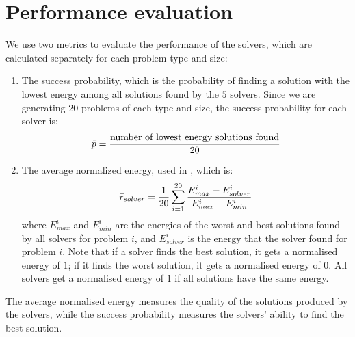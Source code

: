 

\section{Performance evaluation}
We use two metrics to evaluate the performance of the solvers, which are calculated separately for each problem type and size:
\begin{enumerate}
    \item The success probability, which is the probability of finding a solution with the lowest energy among all solutions found by the $5$ solvers. Since we are generating $20$ problems of each type and size, the success probability for each solver is:
    \begin{equation}
        \Bar{p} = \frac{\text{number of lowest energy solutions found}}{20}
    \end{equation}
    \item The average normalized energy, used in \cite{b34}, which is:
    \begin{equation}
        \Bar{r}_{solver} =  \frac{1}{20} \sum_{i = 1}^{20} \frac{E^i_{max} - E^i_{solver}}{E^i_{max} - E^i_{min}}
    \end{equation}
    where $E^i_{max}$ and $E^i_{min}$ are the energies of the worst and best solutions found by all solvers for problem $i$, and $E^i_{solver}$ is the energy that the solver found for problem $i$. Note that if a solver finds the best solution, it gets a normalised energy of $1$; if it finds the worst solution, it gets a normalised energy of $0$. All solvers get a normalised energy of $1$ if all solutions have the same energy.
\end{enumerate}
The average normalised energy measures the quality of the solutions produced by the solvers, while the success probability measures the solvers' ability to find the best solution.